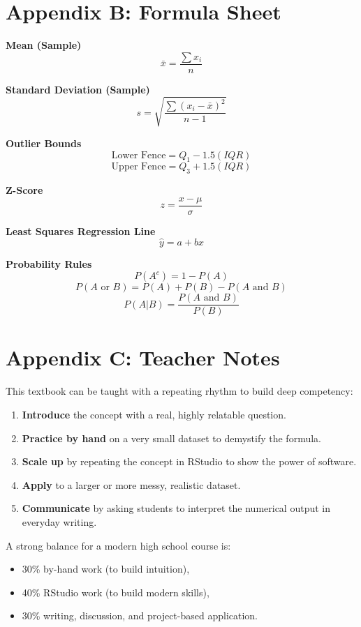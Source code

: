 \documentclass[11pt,openany]{book}
\begin{document}
\chapter*{Appendix B: Formula Sheet}
\textbf{Mean (Sample)}
\[ \bar{x} = \frac{\sum x_i}{n} \]

\textbf{Standard Deviation (Sample)}
\[ s = \sqrt{ \frac{\sum (x_i - \bar{x})^2}{n - 1} } \]

\textbf{Outlier Bounds}
\[ \text{Lower Fence} = Q_1 - 1.5(IQR) \]
\[ \text{Upper Fence} = Q_3 + 1.5(IQR) \]

\textbf{Z-Score}
\[ z = \frac{x - \mu}{\sigma} \]

\textbf{Least Squares Regression Line}
\[ \hat{y} = a + bx \]

\textbf{Probability Rules}
\[ P(A^c) = 1 - P(A) \]
\[ P(A \text{ or } B) = P(A) + P(B) - P(A \text{ and } B) \]
\[ P(A|B) = \frac{P(A \text{ and } B)}{P(B)} \]

\chapter*{Appendix C: Teacher Notes}
This textbook can be taught with a repeating rhythm to build deep competency:
\begin{enumerate}
    \item \textbf{Introduce} the concept with a real, highly relatable question.
    \item \textbf{Practice by hand} on a very small dataset to demystify the formula.
    \item \textbf{Scale up} by repeating the concept in RStudio to show the power of software.
    \item \textbf{Apply} to a larger or more messy, realistic dataset.
    \item \textbf{Communicate} by asking students to interpret the numerical output in everyday writing.
\end{enumerate}

A strong balance for a modern high school course is:
\begin{itemize}
    \item 30\% by-hand work (to build intuition),
    \item 40\% RStudio work (to build modern skills),
    \item 30\% writing, discussion, and project-based application.
\end{itemize}
\end{document}
